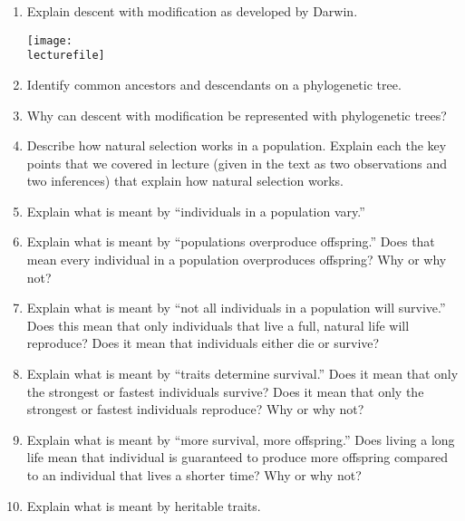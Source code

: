 \documentclass[letterpaper]{tufte-handout}
\newcommand\lecturefile{163_lecture03_fullsize}
\begin{document}
\begin{enumerate}

	\item Explain descent with modification as developed by Darwin. 
	\begin{marginfigure}
		\texttt{[image: \\lecturefile]}
	\end{marginfigure}

	\item Identify common ancestors and descendants on a phylogenetic tree.

	\item Why can descent with modification be represented with phylogenetic trees? 

	\item Describe how natural selection works in a population. Explain each the key points that we covered in lecture (given in the text as two observations and two inferences) that explain how natural selection works.

	\item\label{nsOne} Explain what is meant by ``individuals in a population vary.''

	\item Explain what is meant by ``populations overproduce offspring.'' Does that mean every individual in a population overproduces offspring? Why or why not?

	\item Explain what is meant by ``not all individuals in a population will survive.'' Does this mean that only individuals that live a full, natural life will reproduce? Does it mean that individuals either die or survive?

	\item Explain what is meant by ``traits determine survival.'' Does it mean that only the strongest or fastest individuals survive? Does it mean that only the strongest or fastest individuals reproduce? Why or why not?

	\item\label{nsFour} Explain what is meant by ``more survival, more offspring.'' Does living a long life mean that individual is guaranteed to produce more offspring compared to an individual that lives a shorter time? Why or why not? 

	\item Explain what is meant by heritable traits.


\end{enumerate}
\end{document}
